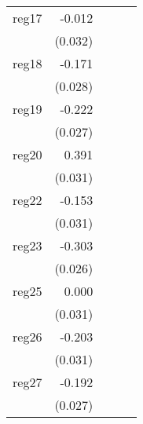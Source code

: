 {\begin{longtable}{l*{4}{D{.}{.}{-1}}}
\addlinespace
reg17       &      -0.012         &                     &                     &                     \\
            &     (0.032)         &                     &                     &                     \\
\addlinespace
reg18       &      -0.171\sym{***}&                     &                     &                     \\
            &     (0.028)         &                     &                     &                     \\
\addlinespace
reg19       &      -0.222\sym{***}&                     &                     &                     \\
            &     (0.027)         &                     &                     &                     \\
\addlinespace
reg20       &       0.391\sym{***}&                     &                     &                     \\
            &     (0.031)         &                     &                     &                     \\
\addlinespace
reg22       &      -0.153\sym{***}&                     &                     &                     \\
            &     (0.031)         &                     &                     &                     \\
\addlinespace
reg23       &      -0.303\sym{***}&                     &                     &                     \\
            &     (0.026)         &                     &                     &                     \\
\addlinespace
reg25       &       0.000         &                     &                     &                     \\
            &     (0.031)         &                     &                     &                     \\
\addlinespace
reg26       &      -0.203\sym{***}&                     &                     &                     \\
            &     (0.031)         &                     &                     &                     \\
\addlinespace
reg27       &      -0.192\sym{***}&                     &                     &                     \\
            &     (0.027)         &                     &                     &                     \\

\end{longtable}}
